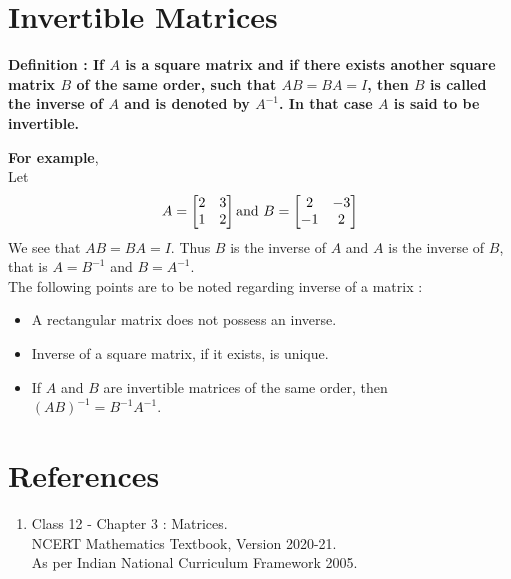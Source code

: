 \documentclass[12pt, letterpaper]{article}
\begin{document}
\section{Invertible Matrices}
\begin{displayquote}
\textbf{Definition : If $A$ is a square matrix and if there exists another square matrix $B$ of the same order, such that $AB = BA = I$, then $B$ is called the inverse of $A$ and is denoted by $A^{-1}$. In that case $A$ is said to be invertible.}
\end{displayquote}
\textbf{For example},\\
Let 
\begin{displaymath}
A = \begin{bmatrix}
2 & 3\\
1 & 2
\end{bmatrix} \textnormal{and} \ B = \begin{bmatrix}
2 & -3\\
-1 & 2
\end{bmatrix}
\end{displaymath}
We see that $AB = BA = I$. Thus $B$ is the inverse of $A$ and $A$ is the inverse of $B$, that is $A = B^{-1}$ and $B = A^{-1}$.\\
The following points are to be noted regarding inverse of a matrix : 
\begin{itemize}
    \item A rectangular matrix does not possess an inverse. 
    \item Inverse of a square matrix, if it exists, is unique.
    \item If $A$ and $B$ are invertible matrices of the same order, then $(AB)^{-1} = B^{-1}A^{-1}$.
\end{itemize}

\section{References}
\begin{enumerate}
    \item Class 12 - Chapter 3 : Matrices.\\ 
    NCERT Mathematics Textbook, Version 2020-21.\\
    As per Indian National Curriculum Framework 2005.
\end{enumerate}
\end{document}
